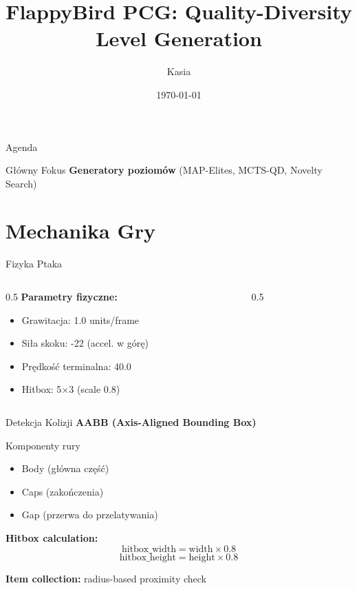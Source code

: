 \documentclass{beamer}
\title{FlappyBird PCG: Quality-Diversity Level Generation}
\author{Kasia}
\date{\today}
\begin{document}
\frame{\titlepage}

\begin{frame}{Agenda}
\tableofcontents[sections={1-4}]
\vspace{0.5cm}
\begin{block}{Główny Fokus}
\textbf{Generatory poziomów} (MAP-Elites, MCTS-QD, Novelty Search)
\end{block}
\end{frame}

\section{Mechanika Gry}

\begin{frame}[fragile]{Fizyka Ptaka}
\begin{columns}
\begin{column}{0.5\textwidth}
\textbf{Parametry fizyczne:}
\begin{itemize}
\item Grawitacja: 1.0 units/frame
\item Siła skoku: -22 (accel. w górę)
\item Prędkość terminalna: 40.0
\item Hitbox: 5×3 (scale 0.8)
\end{itemize}
\end{column}
\begin{column}{0.5\textwidth}

\end{column}
\end{columns}
\end{frame}

\begin{frame}{Detekcja Kolizji}
\textbf{AABB (Axis-Aligned Bounding Box)}

\begin{block}{Komponenty rury}
\begin{itemize}
\item Body (główna część)
\item Caps (zakończenia)
\item Gap (przerwa do przelatywania)
\end{itemize}
\end{block}

\textbf{Hitbox calculation:}
\begin{equation*}
\text{hitbox\_width} = \text{width} \times 0.8
\end{equation*}
\begin{equation*}
\text{hitbox\_height} = \text{height} \times 0.8
\end{equation*}

\textbf{Item collection:} radius-based proximity check
\end{frame}
\end{document}
